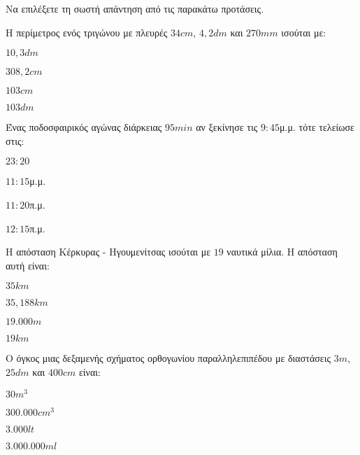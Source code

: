 \documentclass[internet]{diag-xelatex}
\begin{document}
\begin{thema}
\begin{erwthma}
\begin{rlist}
\end{rlist}
\item Να επιλέξετε τη σωστή απάντηση από τις παρακάτω προτάσεις.
\begin{rlist}
\item Η περίμετρος ενός τριγώνου με πλευρές $ 34\si{cm} $, $ 4{,}2\si{dm} $ και $ 270\si{mm} $ ισούται με:
\begin{multicols}{4}
\begin{alist}
\item $ 10{,}3\si{dm} $
\item $ 308{,}2\si{cm} $
\item $ 103\si{cm} $
\item $ 103\si{dm} $
\end{alist}
\end{multicols}
\item Ένας ποδοσφαιρικός αγώνας διάρκειας $ 95\si{min} $ αν ξεκίνησε τις $ 9:45 $μ.μ. τότε τελείωσε στις:
\begin{multicols}{4}
\begin{alist}
\item $ 23:20 $
\item $ 11:15 $μ.μ.
\item $ 11:20 $π.μ.
\item $ 12:15 $π.μ.
\end{alist}
\end{multicols}
\item Η απόσταση Κέρκυρας - Ηγουμενίτσας ισούται με $ 19 $ ναυτικά μίλια. Η απόσταση αυτή είναι:
\begin{multicols}{4}
\begin{alist}
\item $ 35\si{km} $
\item $ 35{,}188\si{km} $
\item $ 19.000\si{m} $
\item $ 19\si{km} $
\end{alist}
\end{multicols}
\item Ο όγκος μιας δεξαμενής σχήματος ορθογωνίου παραλληλεπιπέδου με διαστάσεις $ 3\si{m} $, $ 25\si{dm} $ και $ 400\si{cm} $ είναι:
\begin{multicols}{4}
\begin{alist}
\item $ 30\si{m}^3 $
\item $ 300.000\si{cm}^3 $
\item $ 3.000\si{lt} $
\item $ 3.000.000\si{ml} $

\end{alist}
\end{multicols}
\end{rlist}
\end{erwthma}
\end{thema}
\end{document}
